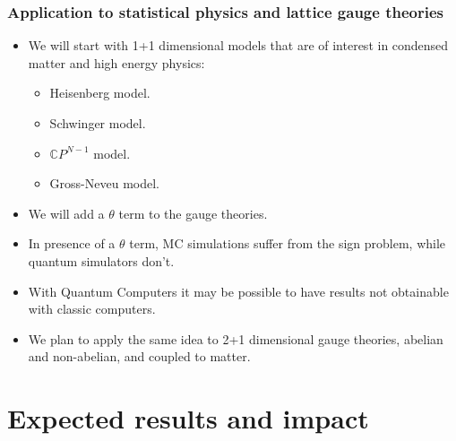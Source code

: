 \documentclass[10pt,t,xcolor=dvipsnames,aspectratio=169]{beamer}
\begin{document}
\begin{frame}
    \frametitle{Application to statistical physics and lattice gauge theories}
    \begin{itemize}
        \item
            We will start with 1+1 dimensional models that are of interest in condensed matter and high energy physics:
            \begin{itemize}
                \item Heisenberg model.
                \item Schwinger model.
                \item $\mathbb CP^{N-1}$ model.
                \item Gross-Neveu model.
            \end{itemize}
        \item
            We will add a $\theta$ term to the gauge theories.
        \item
            In presence of a $\theta$ term, MC simulations suffer from the sign problem, while quantum simulators don't.
        \item
            With Quantum Computers it may be possible to have results not obtainable with classic computers.
        \item
            We plan to apply the same idea to 2+1 dimensional gauge theories, abelian and non-abelian, and coupled to matter.
    \end{itemize}
\end{frame}


\section{Expected results and impact}
\end{document}
